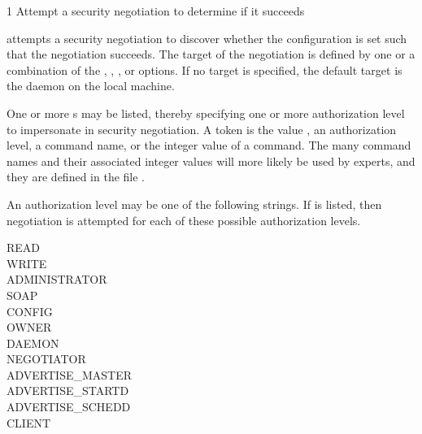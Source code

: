 \begin{ManPage}{\label{man-condor-ping}}{1}
{Attempt a security negotiation to determine if it succeeds}
\Synopsis {}
\ToolArgsBase



\Description
{} attempts a security negotiation to discover whether the
configuration is set such that the negotiation succeeds.
The target of the negotiation is defined by one or a combination of 
the , , , or  options.
If no target is specified,
the default target is the  daemon on the local machine.

One or more s may be listed,
thereby specifying one or more authorization level to impersonate in
security negotiation.
A token is the value , an authorization level,
a command name, or the integer value of a command.
The many command names and their associated integer values will more
likely be used by experts,
and they are defined in the file . 

An authorization level may be one of the following strings.
If  is listed, 
then negotiation is attempted for each of these possible authorization levels.
\begin{description}
\item[READ]
\item[WRITE]
\item[ADMINISTRATOR]
\item[SOAP]
\item[CONFIG]
\item[OWNER]
\item[DAEMON]
\item[NEGOTIATOR]
\item[ADVERTISE\_MASTER]
\item[ADVERTISE\_STARTD]
\item[ADVERTISE\_SCHEDD]
\item[CLIENT]
\end{description}


\end{ManPage}

